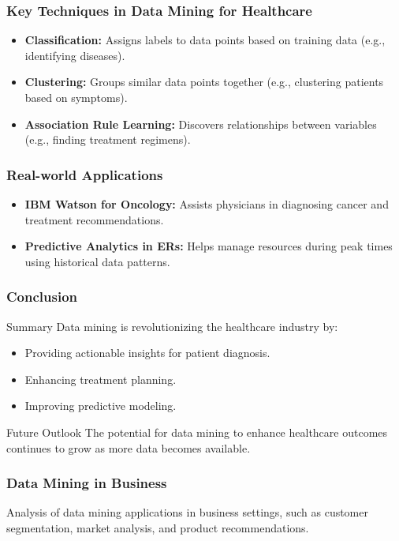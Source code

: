 \documentclass{beamer}
\begin{document}
\begin{frame}[fragile]
    \frametitle{Key Techniques in Data Mining for Healthcare}
    \begin{itemize}
        \item \textbf{Classification:} Assigns labels to data points based on training data (e.g., identifying diseases).
        \item \textbf{Clustering:} Groups similar data points together (e.g., clustering patients based on symptoms).
        \item \textbf{Association Rule Learning:} Discovers relationships between variables (e.g., finding treatment regimens).
    \end{itemize}
\end{frame}

\begin{frame}[fragile]
    \frametitle{Real-world Applications}
    \begin{itemize}
        \item \textbf{IBM Watson for Oncology:} Assists physicians in diagnosing cancer and treatment recommendations.
        \item \textbf{Predictive Analytics in ERs:} Helps manage resources during peak times using historical data patterns.
    \end{itemize}
\end{frame}

\begin{frame}[fragile]
    \frametitle{Conclusion}
    \begin{block}{Summary}
        Data mining is revolutionizing the healthcare industry by:
        \begin{itemize}
            \item Providing actionable insights for patient diagnosis.
            \item Enhancing treatment planning.
            \item Improving predictive modeling.
        \end{itemize}
    \end{block}
    \begin{block}{Future Outlook}
        The potential for data mining to enhance healthcare outcomes continues to grow as more data becomes available.
    \end{block}
\end{frame}

\begin{frame}[fragile]
    \frametitle{Data Mining in Business}
    Analysis of data mining applications in business settings, such as customer segmentation, market analysis, and product recommendations.
\end{frame}
\end{document}
